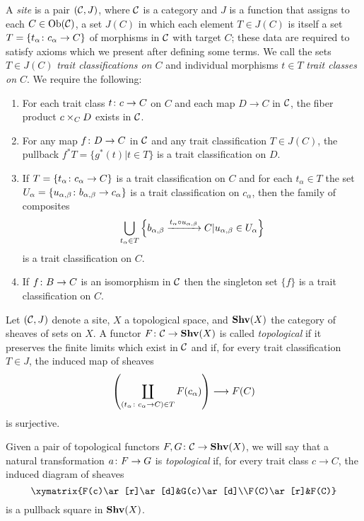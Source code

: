 \documentclass{amsart}
\def\Shv{{\bf Shv}}
\begin{document}
\begin{definition}

A {\em site} is a pair $(\mathcal{C},J)$, where $\mathcal{C}$ is a category and $J$ is a function that assigns to each $C\in\textnormal{Ob}(\mathcal{C})$,  a set $J(C)$ in which each element $T\in J(C)$ is itself a set $T=\{t_\alpha\colon c_\alpha\rightarrow C\}$ of morphisms in $\mathcal{C}$ with target $C$; these data are required to satisfy axioms which we present after defining some terms.  We call the sets $T\in J(C)$ {\em trait classifications on $C$} and individual morphisms $t\in T$ {\em trait classes on $C$}.  We require the following: \begin{enumerate}\item For each trait class $t\colon c\rightarrow C$ on $C$ and each map $D\to C$ in $\mathcal{C}$, the fiber product $c\times_CD$ exists in $\mathcal{C}$.\item For any map $f\colon D\rightarrow C$ in $\mathcal{C}$ and any trait classification $T\in J(C)$, the pullback $f^*T=\{g^*(t)|t\in T\}$ is a trait classification on $D$.\item If $T=\{t_\alpha\colon c_\alpha\rightarrow C\}$ is a trait classification on $C$ and for each $t_\alpha\in T$ the set $U_\alpha=\{u_{\alpha,\beta}\colon b_{\alpha,\beta}\rightarrow c_\alpha\}$ is a trait classification on $c_\alpha$, then the family of composites $$\bigcup_{t_\alpha\in T}\left\{b_{\alpha,\beta}\xrightarrow{t_\alpha\circ u_{\alpha,\beta}}C|u_{\alpha,\beta}\in U_\alpha\right\}$$ is a trait classification on $C$.\item If $f\colon B\rightarrow C$ is an isomorphism in $\mathcal{C}$ then the singleton set $\{f\}$ is a trait classification on $C$.\end{enumerate}

\end{definition}

\begin{definition}

Let $(\mathcal{C},J)$ denote a site, $X$ a topological space, and $\Shv(X)$ the category of sheaves of sets on $X$.  A functor $F\taking\mcC\to\Shv(X)$ is called {\em topological} if it preserves the finite limits which exist in $\mathcal{C}$ and if, for every trait classification $T\in J$, the induced map of sheaves $$\left(\coprod_{(t_\alpha\colon c_\alpha\rightarrow C)\in T}F(c_\alpha)\right)\longrightarrow F(C)$$ is surjective.

Given a pair of topological functors $F,G\taking\mcC\to\Shv(X)$, we will say that a natural transformation $a\colon F\rightarrow G$ is {\em topological} if, for every trait class $c\to C$, the induced diagram of sheaves $$\xymatrix{F(c)\ar[r]\ar[d]&G(c)\ar[d]\\F(C)\ar[r]&F(C)}$$ is a pullback square in $\Shv(X)$.

\end{definition}
\end{document}
